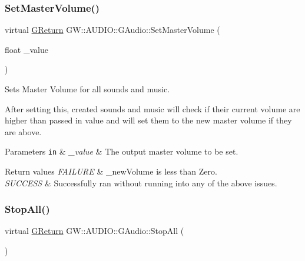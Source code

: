 \subsubsection{\texorpdfstring{Set\+Master\+Volume()}{SetMasterVolume()}}
{\footnotesize\ttfamily virtual \mbox{\hyperlink{namespace_g_w_a67a839e3df7ea8a5c5686613a7a3de21}{G\+Return}} G\+W\+::\+A\+U\+D\+I\+O\+::\+G\+Audio\+::\+Set\+Master\+Volume (\begin{DoxyParamCaption}\item[{float}]{\+\_\+value }\end{DoxyParamCaption})\hspace{0.3cm}{\ttfamily [pure virtual]}}



Sets Master Volume for all sounds and music. 

After setting this, created sounds and music will check if their current volume are higher than passed in value and will set them to the new master volume if they are above. 
\begin{DoxyParams}[1]{Parameters}
\mbox{\tt in}  & {\em \+\_\+value} & The output master volume to be set.\\
\hline
\end{DoxyParams}

\begin{DoxyRetVals}{Return values}
{\em F\+A\+I\+L\+U\+RE} & \+\_\+new\+Volume is less than Zero. \\
\hline
{\em S\+U\+C\+C\+E\+SS} & Successfully ran without running into any of the above issues. \\
\hline
\end{DoxyRetVals}
\mbox{\label{class_g_w_1_1_a_u_d_i_o_1_1_g_audio_aa2571a54d993e8f3f47a32bdf31f6e60}} 
\subsubsection{\texorpdfstring{Stop\+All()}{StopAll()}}
{\footnotesize\ttfamily virtual \mbox{\hyperlink{namespace_g_w_a67a839e3df7ea8a5c5686613a7a3de21}{G\+Return}} G\+W\+::\+A\+U\+D\+I\+O\+::\+G\+Audio\+::\+Stop\+All (\begin{DoxyParamCaption}{ }\end{DoxyParamCaption})\hspace{0.3cm}{\ttfamily [pure virtual]}}



